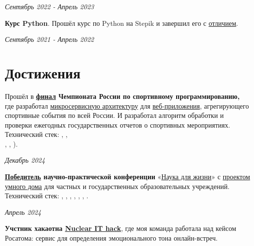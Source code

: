 \documentclass[margin,line]{resume}
\begin{document}
\begin{resume}
  \hfill \textsl{Сентябрь 2022 - Апрель 2023}

  \textbf{Курс Python}. Прошёл курс по Python на Stepik и завершил его с
  \href{https://github.com/alchemmist/CV/blob/main/attachments/stepik-python-course.pdf}{отличием}.

  \vspace{-3mm}

  \hfill \textsl{Сентябрь 2021 - Апрель 2022}

  \section{\mysidestyle Достижения}
  Прошёл в
  \textbf{\href{https://github.com/alchemmist/CV/blob/main/attachments/russian-chemp-final.pdf}{финал}
    Чемпионата России по спортивному
  программированию,} где разработал
  \href{https://github.com/alchemmist/CV/blob/main/attachments/architect.pdf}{микросервисную
  архитектуру} для
  \href{https://github.com/alchemmist/sportporg}{веб-приложения},
  агрегирующего спортивные события по
  всей России. И разработал алгоритм обработки и проверки ежегодных
  государственных
  отчетов о спортивных мероприятиях. Технический стек:
  , , \\
  ,
  ,
).

\vspace{-6mm}

\hfill \textsl{Декабрь 2024}

\textbf{\href{https://github.com/alchemmist/CV/blob/main/attachments/scince-for-life-win.pdf}{Победитель}
научно-практической конференции}
«\href{https://conf.profil.mos.ru/academ}{Наука для
жизни}» с \href{https://github.com/smart-cab/}{проектом умного
дома} для частных и государственных
образовательных учреждений. Технический стек: ,
, , ,
, , .
\vspace{-6mm}

\hfill \textsl{Апрель 2024}

\textbf{Учстник хакаотна \href{https://nuclearhack.mephi.ru/}{Nuclear
IT hack}}, где моя команда работала
над кейсом Росатома: сервис для определения эмоционального тона онлайн-встреч.

\vspace{-6mm}


\end{resume}
\end{document}
